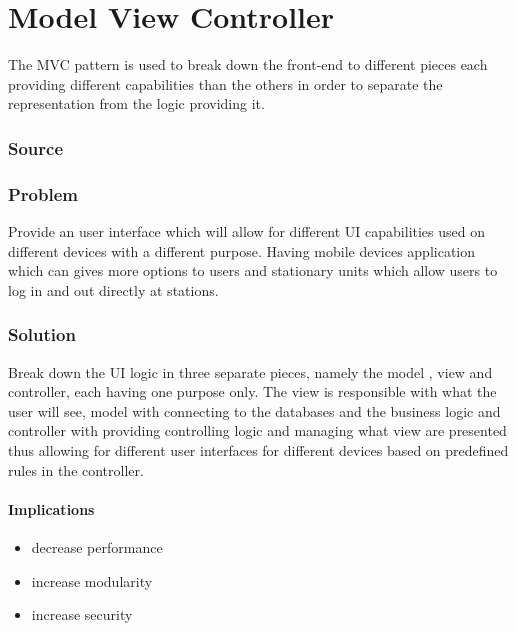 
\section{Model View Controller}
	The MVC pattern is used to break down the front-end to different pieces each providing different capabilities than the others in order to separate the representation from the logic providing it.


	\subsubsection{Source} \cite{book:design-patterns}


	\subsubsection{Problem}

		Provide an user interface which will allow for different UI capabilities used on different devices with a different purpose. Having mobile devices application which can gives more options to users and stationary units which allow users to log in and out directly at stations.

	\subsubsection{Solution} 

		Break down the UI logic in three separate pieces, namely the model , view and controller, each having one purpose only. The view is responsible with what the user will see, model with connecting to the databases and the business logic and controller with providing controlling logic and managing what view are presented thus allowing for different user interfaces for different devices based on predefined rules in the controller. 


\paragraph{Implications}
\begin{itemize}
	\item decrease performance
	\item increase modularity
	\item increase security
\end{itemize}

